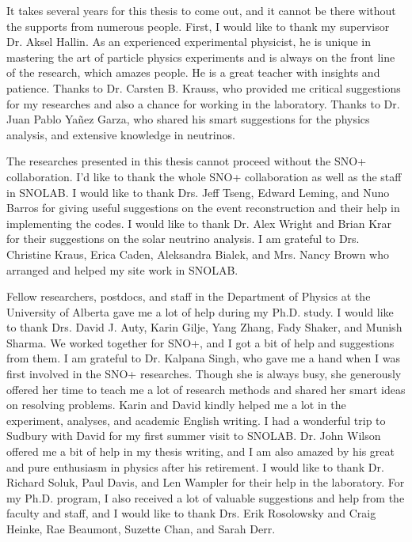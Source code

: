 It takes several years for this thesis to come out, and it cannot be there without the supports from numerous people. First, I would like to thank my supervisor Dr. Aksel Hallin. As an experienced experimental physicist, he is unique in mastering the art of particle physics experiments and is always on the front line of the research, which amazes people. He is a great teacher with insights and patience. Thanks to Dr. Carsten B. Krauss, who provided me critical suggestions for my researches and also a chance for working in the laboratory. Thanks to Dr. Juan Pablo Ya\~{n}ez Garza, who shared his smart suggestions for the physics analysis, and extensive knowledge in neutrinos. 

The researches presented in this thesis cannot proceed without the SNO+ collaboration. I'd like to thank the whole SNO+ collaboration as well as the staff in SNOLAB. I would like to thank Drs. Jeff Tseng, Edward Leming, and Nuno Barros for giving useful suggestions on the event reconstruction and their help in implementing the codes. I would like to thank Dr. Alex Wright and Brian Krar for their suggestions on the solar neutrino analysis. I am grateful to Drs. Christine Kraus, Erica Caden, Aleksandra Bialek, and Mrs. Nancy Brown who arranged and helped my site work in SNOLAB.

Fellow researchers, postdocs, and staff in the Department of Physics at the University of Alberta gave me a lot of help during my Ph.D. study. I would like to thank Drs. David J. Auty, Karin Gilje, Yang Zhang, Fady Shaker, and Munish Sharma. We worked together for SNO+, and I got a bit of help and suggestions from them. I am grateful to Dr. Kalpana Singh, who gave me a hand when I was first involved in the SNO+ researches. Though she is always busy, she generously offered her time to teach me a lot of research methods and shared her smart ideas on resolving problems. Karin and David kindly helped me a lot in the experiment, analyses, and academic English writing. I had a wonderful trip to Sudbury with David for my first summer visit to SNOLAB. Dr. John Wilson offered me a bit of help in my thesis writing, and I am also amazed by his great and pure enthusiasm in physics after his retirement. I would like to thank Dr. Richard Soluk, Paul Davis, and Len Wampler for their help in the laboratory. For my Ph.D. program, I also received a lot of valuable suggestions and help from the faculty and staff, and I would like to thank Drs. Erik Rosolowsky and Craig Heinke, Rae Beaumont, Suzette Chan, and Sarah Derr.

